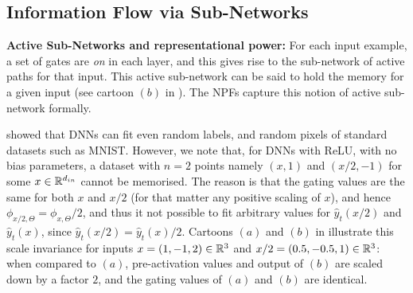 \subsection{Information Flow via Sub-Networks}
\textbf{Active Sub-Networks and representational power:} For each input example, a set of gates are \emph{on} in each layer, and this gives rise to the sub-network of active paths for that input. This active sub-network can be said to hold the memory for a given input (see cartoon $(b)$ in ). The NPFs capture this notion of active sub-network formally.

\cite{ben} showed that DNNs can fit even random labels, and random pixels of standard datasets such as MNIST. However, we note that, for DNNs with ReLU, with no bias parameters, a dataset with $n=2$ points namely $(x,1)$ and $(x/2,-1)$ for some $x\in \mathbb{R}^{d_{in}}$ cannot be memorised. The reason is that the gating values are the same for both $x$ and $x/2$ (for that matter any positive scaling of $x$), and hence $\phi_{x/2,\Theta}= \phi_{x,\Theta}/2$, and thus it not possible to fit arbitrary values for $\hat{y}_t(x/2)$ and $\hat{y}_t(x)$, since $\hat{y}_t(x/2)= \hat{y}_t(x)/2$. Cartoons $(a)$ and $(b)$ in  illustrate this scale invariance for inputs $x=(1,-1,2)\in\mathbb{R}^3$ and $x/2=(0.5,-0.5,1)\in\mathbb{R}^3$:  when compared to $(a)$, pre-activation values and output of $(b)$ are scaled down by a factor $2$, and the gating values of $(a)$ and $(b)$ are identical.
